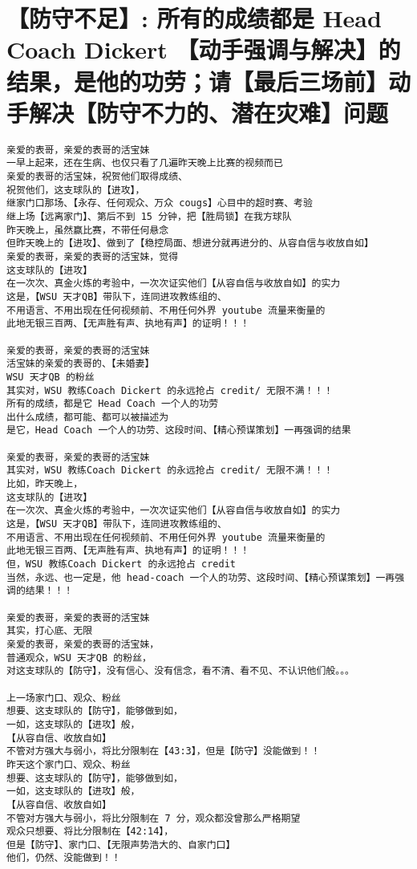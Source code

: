 \documentclass[9pt, b5paper]{article}
\begin{document}
\section{【防守不足】: 所有的成绩都是 Head Coach Dickert 【动手强调与解决】的结果，是他的功劳；请【最后三场前】动手解决【防守不力的、潜在灾难】问题}
\label{sec-7}
\begin{verbatim}
亲爱的表哥，亲爱的表哥的活宝妹
一早上起来，还在生病、也仅只看了几遍昨天晚上比赛的视频而已
亲爱的表哥的活宝妹，祝贺他们取得成绩、
祝贺他们，这支球队的【进攻】，
继家门口那场、【永存、任何观众、万众 cougs】心目中的超时赛、考验
继上场【远离家门】、第后不到 15 分钟，把【胜局锁】在我方球队
昨天晚上，虽然赢比赛，不带任何悬念
但昨天晚上的【进攻】、做到了【稳控局面、想进分就再进分的、从容自信与收放自如】
亲爱的表哥，亲爱的表哥的活宝妹，觉得
这支球队的【进攻】
在一次次、真金火炼的考验中，一次次证实他们【从容自信与收放自如】的实力
这是，【WSU 天才QB】带队下，连同进攻教练组的、
不用语言、不用出现在任何视频前、不用任何外界 youtube 流量来衡量的
此地无银三百两、【无声胜有声、执地有声】的证明！！！

亲爱的表哥，亲爱的表哥的活宝妹
活宝妹的亲爱的表哥的、【未婚妻】
WSU 天才QB 的粉丝
其实对，WSU 教练Coach Dickert 的永远抢占 credit/ 无限不满！！！
所有的成绩，都是它 Head Coach 一个人的功劳
出什么成绩，都可能、都可以被描述为
是它，Head Coach 一个人的功劳、这段时间、【精心预谋策划】一再强调的结果 

亲爱的表哥，亲爱的表哥的活宝妹
其实对，WSU 教练Coach Dickert 的永远抢占 credit/ 无限不满！！！
比如，昨天晚上，
这支球队的【进攻】
在一次次、真金火炼的考验中，一次次证实他们【从容自信与收放自如】的实力
这是，【WSU 天才QB】带队下，连同进攻教练组的、
不用语言、不用出现在任何视频前、不用任何外界 youtube 流量来衡量的
此地无银三百两、【无声胜有声、执地有声】的证明！！！
但，WSU 教练Coach Dickert 的永远抢占 credit
当然，永远、也一定是，他 head-coach 一个人的功劳、这段时间、【精心预谋策划】一再强调的结果！！！

亲爱的表哥，亲爱的表哥的活宝妹
其实，打心底、无限
亲爱的表哥，亲爱的表哥的活宝妹，
普通观众，WSU 天才QB 的粉丝，
对这支球队的【防守】，没有信心、没有信念，看不清、看不见、不认识他们般。。。

上一场家门口、观众、粉丝
想要、这支球队的【防守】，能够做到如，
一如，这支球队的【进攻】般，
【从容自信、收放自如】
不管对方强大与弱小，将比分限制在【43:3】，但是【防守】没能做到！！
昨天这个家门口、观众、粉丝
想要、这支球队的【防守】，能够做到如，
一如，这支球队的【进攻】般，
【从容自信、收放自如】
不管对方强大与弱小，将比分限制在 7 分，观众都没曾那么严格期望
观众只想要、将比分限制在【42:14】，
但是【防守】、家门口、【无限声势浩大的、自家门口】
他们，仍然、没能做到！！


\end{verbatim}
\end{document}
